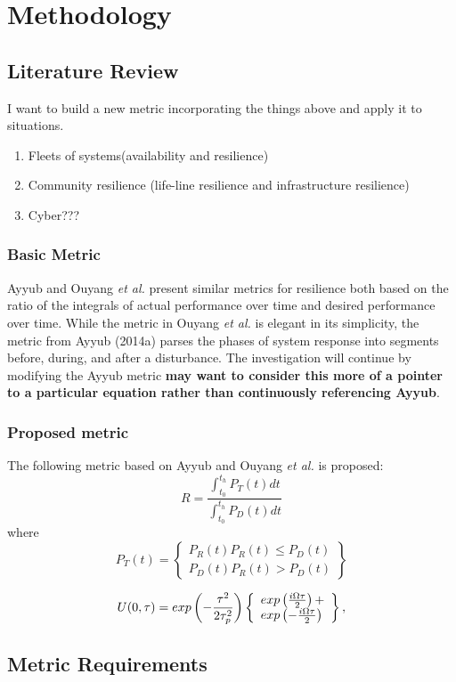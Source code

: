 
\renewcommand{\thechapter}{4}

\chapter{Methodology}

\section{Literature Review}
I want to build a new metric incorporating the things above and apply
it to situations.
\begin{enumerate}
\item Fleets of systems(availability and resilience)
  \item Community resilience (life-line resilience and infrastructure
    resilience)
  \item Cyber???
\end{enumerate}

\subsection{Basic Metric}
Ayyub \cite{Ayyub2014a} and Ouyang \emph{et al.} \cite{Ouyang2012}
present similar metrics for resilience both based on the ratio of the
integrals of actual performance over time and desired performance over
time. While the metric in Ouyang \emph{et al.} is elegant in its
simplicity, the metric from Ayyub (2014a) parses the phases of system
response into segments before, during, and after a disturbance. The
investigation will continue by modifying the Ayyub metric \textbf{may
  want to consider this more of a pointer to a particular equation
  rather than continuously referencing Ayyub}.

\subsection{Proposed metric}
The following metric based on Ayyub \cite{Ayyub2014a, Ayyub2015} and
Ouyang \emph{et al.} \cite{Ouyang2012} is proposed:
$$R = \frac{\int_{t_0}^{t_h}P_T(t)dt}{\int_{t_0}^{t_h}P_D(t)dt}$$
where
\begin{equation}
  P_T(t)=
  \left\{
  \begin{array}{l}
    P_R(t)   P_R(t) \le P_D(t) \\
    P_D(t)   P_R(t) > P_D(t)
  \end{array}
  \right\}
\end{equation}

\begin {equation}
U(0,\tau) = exp \left( - {\tau^2 \over 2\tau_p^2} \right)
\left\{ 
\begin{array}{l}
exp\left( {i\Omega\tau \over 2} \right) + \\
exp\left( - {i\Omega\tau \over 2} \right)
\end{array}
\right\} ,
\end{equation}


\section{Metric Requirements}

